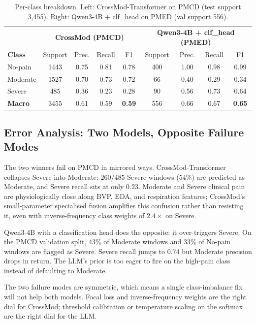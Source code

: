 \documentclass{article}
\begin{document}
\begin{table}[t]
\centering
\caption{Per-class breakdown. Left: CrossMod-Transformer on PMCD (test support 3{,}455). Right: Qwen3-4B + clf\_head on PMED (val support 556).}
\label{tab:perclass}
\small
\begin{tabular}{@{}lcccc|cccc@{}}
\toprule
& \multicolumn{4}{c|}{\textbf{CrossMod (PMCD)}} & \multicolumn{4}{c}{\textbf{Qwen3-4B + clf\_head (PMED)}} \\
\textbf{Class} & Support & Prec. & Recall & F1 & Support & Prec. & Recall & F1 \\
\midrule
No-pain  & 1443 & 0.75 & 0.81 & 0.78 & 400 & 1.00 & 0.98 & 0.99 \\
Moderate & 1527 & 0.70 & 0.73 & 0.72 &  66 & 0.40 & 0.29 & 0.34 \\
Severe   &  485 & 0.36 & 0.23 & 0.28 &  90 & 0.56 & 0.73 & 0.64 \\
\midrule
\textbf{Macro} & 3455 & 0.61 & 0.59 & \textbf{0.59} & 556 & 0.66 & 0.67 & \textbf{0.65} \\
\bottomrule
\end{tabular}
\end{table}

\subsection{Error Analysis: Two Models, Opposite Failure Modes}
\label{sec:error_analysis}

The two winners fail on PMCD in mirrored ways. CrossMod-Transformer collapses Severe into Moderate: $260/485$ Severe windows ($54\%$) are predicted as Moderate, and Severe recall sits at only $0.23$. Moderate and Severe clinical pain are physiologically close along BVP, EDA, and respiration features; CrossMod's small-parameter specialised fusion amplifies this confusion rather than resisting it, even with inverse-frequency class weights of $2.4\times$ on Severe.

Qwen3-4B with a classification head does the opposite: it over-triggers Severe. On the PMCD validation split, $43\%$ of Moderate windows and $33\%$ of No-pain windows are flagged as Severe. Severe recall jumps to $0.74$ but Moderate precision drops in return. The LLM's prior is too eager to fire on the high-pain class instead of defaulting to Moderate.

The two failure modes are symmetric, which means a single class-imbalance fix will not help both models. Focal loss and inverse-frequency weights are the right dial for CrossMod; threshold calibration or temperature scaling on the softmax are the right dial for the LLM.
\end{document}
